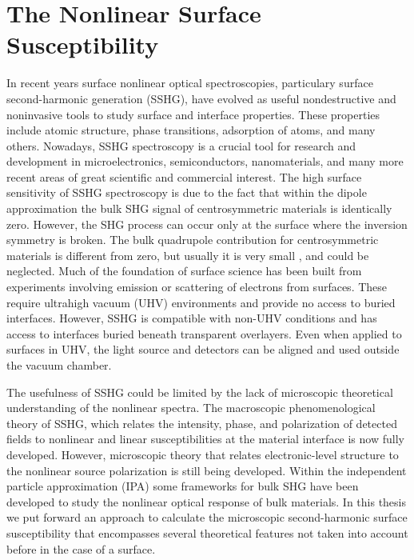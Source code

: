 \chapter{The Nonlinear Surface Susceptibility}\label{chap:chi2}
\partialtoc


In recent years surface nonlinear optical spectroscopies, particulary surface
second-harmonic generation (SSHG), have evolved as useful nondestructive and
noninvasive tools to study surface and interface properties. These properties
include atomic structure, phase transitions, adsorption of atoms, and many
others.\cite{daumPRL93, mcgilpOE94, meyerPRL95, powerPRL95, godefroyAPL96,
hoferAPA96, dadapPRB97, bloembergenAPB99, mcgilpSRL99, suzukiAPB99,
mitchellSS01, hughesPRB96, guyotPRB88, downerPSSA01, shenAPB99, shenNAT89,
chenPRL81, mendozaPRL98, downerSIA01} Nowadays, SSHG spectroscopy is a crucial
tool for research and development in microelectronics,
\cite{zheltikovLP00} semiconductors, \cite{lupkeSSR99} nanomaterials,
\cite{salazar-aparicioPRB14} and many more recent areas of great scientific and
commercial interest.\cite{cazzanelliNM14} The high surface sensitivity of SSHG
spectroscopy is due to the fact that within the dipole approximation the bulk
SHG signal of centrosymmetric materials is identically zero. However, the SHG
process can occur only at the surface where the inversion symmetry is broken.
The bulk quadrupole contribution for centrosymmetric materials is different from
zero, but usually it is very small \cite{downerSIA01}, and could be neglected.
Much of the foundation of surface science has been built from experiments
involving emission or scattering of electrons from surfaces. These require
ultrahigh vacuum (UHV) environments and provide no access to buried interfaces.
However, SSHG is compatible with non-UHV conditions and has access to interfaces
buried beneath transparent overlayers. Even when applied to surfaces in UHV, the
light source and detectors can be aligned and used outside the vacuum chamber.

The usefulness of SSHG could be limited by the lack of microscopic theoretical
understanding of the nonlinear spectra. The macroscopic phenomenological theory
of SSHG, which relates the intensity, phase, and polarization of detected fields
to nonlinear and linear susceptibilities at the material interface is now fully
developed.\cite{downerSIA01} However, microscopic theory that relates
electronic-level structure to the nonlinear source polarization is still being
developed. \cite{butcherPOPS63, aspnesPRB72, sipePRB93, levinePRB94,aversaPRB95,
hughesPRB96, rashkeevPRB98,beyond} Within the independent particle approximation
(IPA) some frameworks for bulk SHG have been developed to study the nonlinear
optical response of bulk materials. \cite{butcherPOPS63, aspnesPRB72, sipePRB93,
levinePRB94,aversaPRB95, hughesPRB96, rashkeevPRB98} In this thesis we put
forward an approach to calculate the microscopic second-harmonic surface
susceptibility that encompasses several theoretical features not taken into
account before in the case of a surface.

